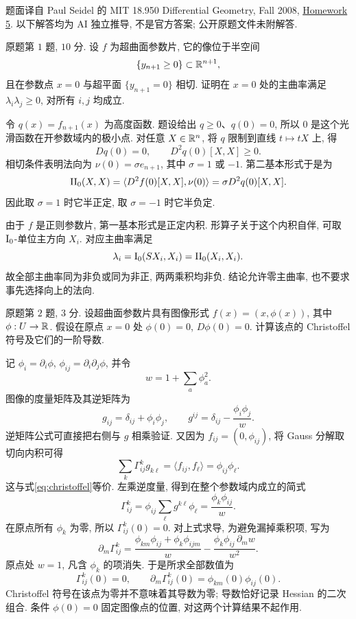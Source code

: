 \par{}
题面译自 Paul Seidel 的 MIT 18.950 Differential Geometry, Fall 2008,
\href{https://ocw.mit.edu/courses/18-950-differential-geometry-fall-2008/resources/homework5/}{Homework 5}.
以下解答均为 AI 独立推导, 不是官方答案; 公开原题文件未附解答.

\begin{exercise}\label{ps:5-1}
原题第 $1$ 题, $10$ 分. 设 $f$ 为超曲面参数片, 它的像位于半空间
\[
 \{y_{n+1}\ge0\}\subset\mathbb R^{n+1},
\]
且在参数点 $x=0$ 与超平面 $\{y_{n+1}=0\}$ 相切. 证明在 $x=0$ 处的主曲率满足 $\lambda_i\lambda_j\ge0$, 对所有 $i,j$ 均成立.
\end{exercise}
\begin{solution}
令 $q(x)=f_{n+1}(x)$ 为高度函数. 题设给出 $q\ge0$、$q(0)=0$, 所以 $0$ 是这个光滑函数在开参数域内的极小点. 对任意 $X\in\mathbb R^n$, 将 $q$ 限制到直线 $t\mapsto tX$ 上, 得
\[
 Dq(0)=0,\qquad D^2q(0)[X,X]\ge0.
\]
相切条件表明法向为 $\nu(0)=\sigma e_{n+1}$, 其中 $\sigma=1$ 或 $-1$. 第二基本形式于是为
\[
 \mathrm{II}_0(X,X)
 =\langle D^2f(0)[X,X],\nu(0)\rangle
 =\sigma D^2q(0)[X,X].
\]
因此取 $\sigma=1$ 时它半正定, 取 $\sigma=-1$ 时它半负定.

由于 $f$ 是正则参数片, 第一基本形式是正定内积. 形算子关于这个内积自伴, 可取 $\mathrm{I}_0$-单位主方向 $X_i$. 对应主曲率满足
\[
 \lambda_i=\mathrm{I}_0(SX_i,X_i)=\mathrm{II}_0(X_i,X_i).
\]
故全部主曲率同为非负或同为非正, 两两乘积均非负. 结论允许零主曲率, 也不要求事先选择向上的法向.
\end{solution}

\begin{exercise}\label{ps:5-2}
原题第 $2$ 题, $3$ 分. 设超曲面参数片具有图像形式 $f(x)=(x,\phi(x))$, 其中 $\phi:U\to\mathbb R$. 假设在原点 $x=0$ 处 $\phi(0)=0$, $D\phi(0)=0$. 计算该点的 Christoffel 符号及它们的一阶导数.
\end{exercise}
\begin{solution}
记 $\phi_i=\partial_i\phi$, $\phi_{ij}=\partial_i\partial_j\phi$, 并令
\[
 w=1+\sum_a\phi_a^2.
\]
图像的度量矩阵及其逆矩阵为
\[
 g_{ij}=\delta_{ij}+\phi_i\phi_j,\qquad
 g^{ij}=\delta_{ij}-\frac{\phi_i\phi_j}{w}.
\]
逆矩阵公式可直接把右侧与 $g$ 相乘验证. 又因为 $f_{ij}=(0,\phi_{ij})$, 将 Gauss 分解取切向内积可得
\[
 \sum_k\Gamma^k_{ij}g_{k\ell}
 =\langle f_{ij},f_\ell\rangle
 =\phi_{ij}\phi_\ell.
\]
这与式\eqref{eq:christoffel}等价. 左乘逆度量, 得到在整个参数域内成立的简式
\[
 \Gamma^k_{ij}=\phi_{ij}\sum_\ell g^{k\ell}\phi_\ell
 =\frac{\phi_k\phi_{ij}}{w}.
\]
在原点所有 $\phi_k$ 为零, 所以 $\Gamma^k_{ij}(0)=0$. 对上式求导, 为避免漏掉乘积项, 写为
\[
 \partial_m\Gamma^k_{ij}
 =\frac{\phi_{km}\phi_{ij}+\phi_k\phi_{ijm}}{w}
 -\frac{\phi_k\phi_{ij}\,\partial_m w}{w^2}.
\]
原点处 $w=1$, 凡含 $\phi_k$ 的项消失. 于是所求全部数值为
\[
 \boxed{\Gamma^k_{ij}(0)=0,\qquad
 \partial_m\Gamma^k_{ij}(0)=\phi_{km}(0)\phi_{ij}(0).}
\]
Christoffel 符号在该点为零并不意味着其导数为零; 导数恰好记录 Hessian 的二次组合. 条件 $\phi(0)=0$ 固定图像点的位置, 对这两个计算结果不起作用.
\end{solution}

